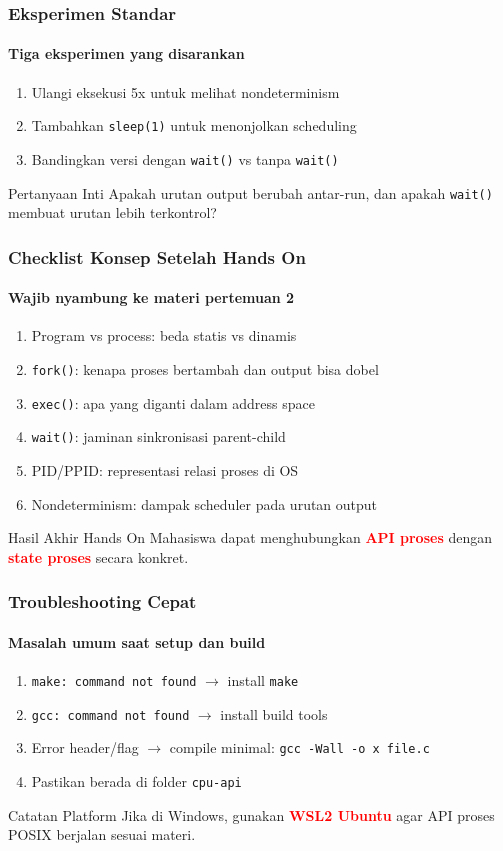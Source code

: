 \documentclass[t,aspectratio=169,xcolor=dvipsnames]{beamer}
\newcommand{\tem}[1]{\textbf{\textcolor{red}{#1}}}
\begin{document}
\begin{frame}
    \frametitle{Eksperimen Standar}
    \framesubtitle{Tiga eksperimen yang disarankan}
    \small
    \begin{enumerate}
        \item Ulangi eksekusi 5x untuk melihat nondeterminism
        \item Tambahkan \texttt{sleep(1)} untuk menonjolkan scheduling
        \item Bandingkan versi dengan \texttt{wait()} vs tanpa \texttt{wait()}
    \end{enumerate}
    \begin{alertblock}{Pertanyaan Inti}
        Apakah urutan output berubah antar-run, dan apakah \texttt{wait()} membuat urutan lebih terkontrol?
    \end{alertblock}
\end{frame}

\begin{frame}
    \frametitle{Checklist Konsep Setelah Hands On}
    \framesubtitle{Wajib nyambung ke materi pertemuan 2}
    \small
    \begin{enumerate}
        \item Program vs process: beda statis vs dinamis
        \item \texttt{fork()}: kenapa proses bertambah dan output bisa dobel
        \item \texttt{exec()}: apa yang diganti dalam address space
        \item \texttt{wait()}: jaminan sinkronisasi parent-child
        \item PID/PPID: representasi relasi proses di OS
        \item Nondeterminism: dampak scheduler pada urutan output
    \end{enumerate}
    \begin{block}{Hasil Akhir Hands On}
        Mahasiswa dapat menghubungkan \tem{API proses} dengan \tem{state proses} secara konkret.
    \end{block}
\end{frame}

\begin{frame}
    \frametitle{Troubleshooting Cepat}
    \framesubtitle{Masalah umum saat setup dan build}
    \small
    \begin{enumerate}
        \item \texttt{make: command not found} $\rightarrow$ install \texttt{make}
        \item \texttt{gcc: command not found} $\rightarrow$ install build tools
        \item Error header/flag $\rightarrow$ compile minimal: \texttt{gcc -Wall -o x file.c}
        \item Pastikan berada di folder \texttt{cpu-api}
    \end{enumerate}
    \begin{exampleblock}{Catatan Platform}
        Jika di Windows, gunakan \tem{WSL2 Ubuntu} agar API proses POSIX berjalan sesuai materi.
    \end{exampleblock}
\end{frame}
\end{document}
